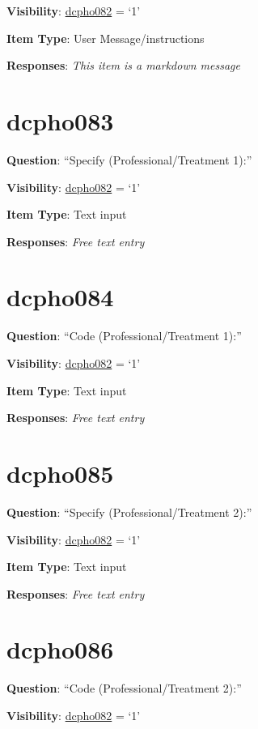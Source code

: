 \documentclass[]{book}
\begin{document}
\textbf{Visibility}: \protect\hyperlink{dcpho082}{dcpho082} = `1'

\textbf{Item Type}: User Message/instructions

\textbf{Responses}: \emph{This item is a markdown message}

\hypertarget{dcpho083}{%
\section{dcpho083}\label{dcpho083}}

\textbf{Question}: ``Specify (Professional/Treatment 1):''

\textbf{Visibility}: \protect\hyperlink{dcpho082}{dcpho082} = `1'

\textbf{Item Type}: Text input

\textbf{Responses}: \emph{Free text entry}

\hypertarget{dcpho084}{%
\section{dcpho084}\label{dcpho084}}

\textbf{Question}: ``Code (Professional/Treatment 1):''

\textbf{Visibility}: \protect\hyperlink{dcpho082}{dcpho082} = `1'

\textbf{Item Type}: Text input

\textbf{Responses}: \emph{Free text entry}

\hypertarget{dcpho085}{%
\section{dcpho085}\label{dcpho085}}

\textbf{Question}: ``Specify (Professional/Treatment 2):''

\textbf{Visibility}: \protect\hyperlink{dcpho082}{dcpho082} = `1'

\textbf{Item Type}: Text input

\textbf{Responses}: \emph{Free text entry}

\hypertarget{dcpho086}{%
\section{dcpho086}\label{dcpho086}}

\textbf{Question}: ``Code (Professional/Treatment 2):''

\textbf{Visibility}: \protect\hyperlink{dcpho082}{dcpho082} = `1'
\end{document}

